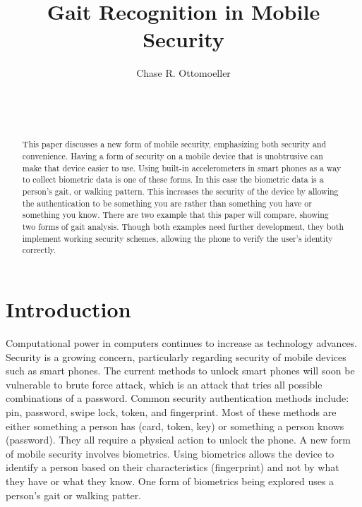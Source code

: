 \documentclass{sig-alternate}
\begin{document}

\title{Gait Recognition in Mobile Security}


\author{
\alignauthor
Chase R. Ottomoeller\\
	\\
	\\
	\\
}

\maketitle




\begin{abstract}
This paper discusses a new form of mobile security, emphasizing both security and convenience. Having a form of security on a mobile device that is unobtrusive can make that device easier to use. Using built-in accelerometers in smart phones as a way to collect biometric data is one of these forms. In this case the biometric data is a person's gait, or walking pattern. This increases the security of the device by allowing the authentication to be something you are rather than something you have or something you know. There are two example that this paper will compare, showing two forms of gait analysis. Though both examples need further development, they both implement working security schemes, allowing the phone to  verify the user's identity correctly.  
\end{abstract}




\section{Introduction}
	Computational power in computers continues to increase as technology advances. Security is a growing concern, particularly regarding security of mobile devices such as smart phones. The current methods to unlock smart phones will soon be vulnerable to brute force  attack, which is an attack that tries all possible combinations of a password. Common security authentication methods include: pin, password, swipe lock, token, and fingerprint. Most of these methods are either something a person has (card, token, key) or something a person knows (password). They all require a physical action to unlock the phone. A new form of mobile security involves biometrics. Using biometrics allows the device to identify a person based on their characteristics (fingerprint) and not by what they have or what they know.  One form of biometrics being explored uses a person's gait or walking patter. 
	
\end{document}
